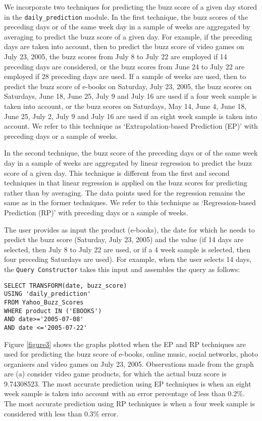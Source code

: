 \documentclass[10pt, conference, compsocconf]{IEEEtran}
\begin{document}
We incorporate two techniques for predicting the buzz score of a given day stored in the \texttt{daily\_prediction} module. In the first technique, the buzz scores of the preceding  days or of the same week day in a sample of  weeks are aggregated by averaging to predict the buzz score of a given day. For example, if the preceding  days are taken into account, then to predict the buzz score of video games on July 23, 2005, the buzz scores from July 8 to July 22 are employed if 14 preceding days are considered, or the buzz scores from June 24 to July 22 are employed if 28 preceding days are used. If a sample of  weeks are used, then to predict the buzz score of e-books on Saturday, July 23, 2005, the buzz scores on Saturdays, June 18, June 25, July 9 and July 16 are used if a four week sample is taken into account, or the buzz scores on Saturdays, May 14, June 4, June 18, June 25, July 2, July 9 and July 16 are used if an eight week sample is taken into account. We refer to this technique as `Extrapolation-based Prediction (EP)' with preceding  days or a sample of  weeks. 

In the second technique, the buzz score of the preceding  days or of the same week day in a sample of  weeks are aggregated by linear regression to predict the buzz score of a given day. This technique is different from the first and second techniques in that linear regression is applied on the buzz scores for predicting rather than by averaging. The data points used for the regression remains the same as in the former techniques. We refer to this technique as `Regression-based Prediction (RP)' with preceding  days or a sample of  weeks.

The user provides as input the product (e-books), the date for which he needs to predict the buzz score (Saturday, July 23, 2005) and the  value (if 14 days are selected, then July 8 to July 22 are used, or if a 4 week sample is selected, then four preceding Saturdays are used). For example, when the user selects 14 days, the \texttt{Query Constructor} takes this input and assembles the query as follows: 

\begin{verbatim}
SELECT TRANSFORM(date, buzz_score)
USING 'daily_prediction' 
FROM Yahoo_Buzz_Scores
WHERE product IN ('EBOOKS')
AND date>='2005-07-08' 
AND date <='2005-07-22'
\end{verbatim}

Figure \ref{figure3} shows the graphs plotted when the EP and RP techniques are used for predicting the buzz score of e-books, online music, social networks, photo organisers and video games on July 23, 2005. Observations made from the graph are (a) consider video game products, for which the actual buzz score is 9.74308523. The most accurate prediction using EP techniques is when an eight week sample is taken into account with an error percentage of less than 0.2\%. The most accurate prediction using RP techniques is when a four week sample is considered with less than 0.3\% error. 
\end{document}
